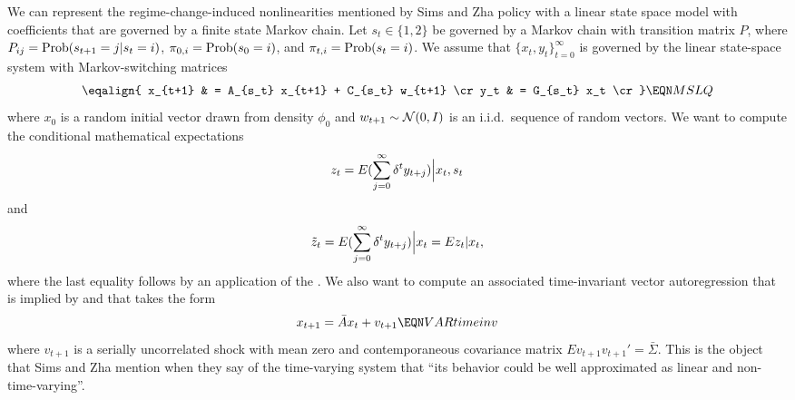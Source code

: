 We  can  represent the regime-change-induced 
nonlinearities mentioned by Sims and Zha policy  with  a linear state space model with
 coefficients that are governed by a finite state Markov chain.
Let $s_t \in \{1,2\}$ be governed by a Markov chain with transition matrix $P$, where
$P_{ij} = {\rm Prob}(s_{t+1} = j| s_t  = i) $, $\pi_{0,i} = {\rm Prob}(s_0 = i)$, and  $\pi_{t,i} = {\rm Prob}(s_t = i)$.
We assume that $\{x_{t}, y_t\}_{t=0}^\infty$ is governed by  the linear state-space system with  
 Markov-switching matrices  
$$ \eqalign{ x_{t+1} & = A_{s_t} x_{t+1} + C_{s_t} w_{t+1} \cr
                    y_t  & = G_{s_t} x_t  \cr  }   \EQN MSLQ $$ %
where $x_0 $ is a random initial vector drawn from  density  $\phi_0$ and $w_{t+1} \sim {\cal N}(0,I)$ is an i.i.d.~sequence of random
vectors.
We   want to compute the conditional  mathematical expectations
 $$ z_t = E ( \sum_{j=0}^\infty \delta^t y_{t+j} ) \Bigl| x_t, s_t  $$
  and
 $$ \tilde z_t =  E ( \sum_{j=0}^\infty \delta^t y_{t+j} ) \Bigl| x_t =  E z_t | x_t , $$
 where the last equality follows by an application of the .
 We also want to compute an associated  time-invariant vector autoregression that is implied by    and that takes the form
  $$ x_{t+1} = \bar A x_t + v_{t+1} \EQN VARtimeinv$$
  where $v_{t+1} $ is a serially uncorrelated shock with mean zero and contemporaneous covariance matrix $E v_{t+1} v_{t+1}' = \bar \Sigma$.
This is the object that Sims and Zha mention when they say of the time-varying system that ``its behavior could be well approximated as linear and non-time-varying''.
%
%
%
%
%



